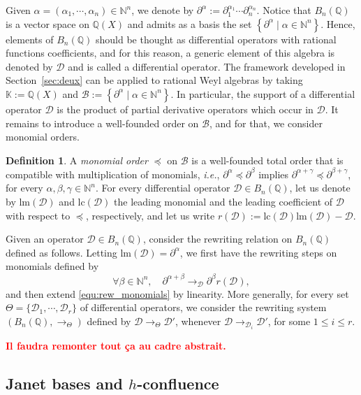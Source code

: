 \documentclass[10pt]{easychair}
\theoremstyle{definition}
\newtheorem{definition}[theorem]{Definition}
\newcommand\secTroisDeux{Janet bases and $h$-confluence}
\newcommand\ie{\emph{i.e.}}
\newcommand\todo[1]{{\bf\textcolor{red}{#1.}}}
\newcommand\diff[1]{\partial_{#1}}
\newcommand\D{\mathcal{D}}
\newcommand\lm{\text{lm}}
\newcommand\lc{\text{lc}}
\newcommand\basis{\mathscr{B}}
\newcommand\K{\mathbb{K}}
\newcommand\Q{\mathbb{Q}}
\newcommand\N{\mathbb{N}}
\newcommand\Weyl{B_n(\Q)}
\newcommand\rewTheta{\to_{\Theta}}
\begin{document}
Given $\alpha=(\alpha_1,\cdots,\alpha_n)\in\N^n$, we denote by 
$\partial^{\alpha}:=\diff{1}^{\alpha_1}\cdots\diff{n}^{\alpha_n}$. Notice
that $\Weyl$ is a vector space on $\Q(X)$ and admits as a basis the set
$\left\{\partial^\alpha\mid\alpha\in\N^n\right\}$. Hence, elements of
$\Weyl$ should be thought as differential operators with rational
functions coefficients, and for this reason, a generic element of this
algebra is denoted by $\D$ and is called a differential operator. The
framework developed in Section~\ref{sec:deux} can be applied to rational
Weyl algebras by taking $\K:=\Q(X)$ and
$\basis:=\left\{\partial^\alpha\mid\alpha\in\N^n\right\}$. In particular,
the support of a differential operator $\D$ is the product of partial
derivative operators which occur in $\D$. It remains to introduce a
well-founded order on $\basis$, and for that, we consider monomial
orders.

\begin{definition}
  A {\em monomial order} $\preceq$ on $\basis$ is a well-founded total
  order that is compatible with multiplication of monomials, \ie,
  $\partial^{\alpha}\preceq\partial^{\beta}$ implies 
  $\partial^{\alpha+\gamma}\preceq\partial^{\beta+\gamma}$, for every
  $\alpha,\beta,\gamma\in\N^n$. For every differential operator
  $\D\in\Weyl$, let us denote by $\lm(\D)$ and $\lc(\D)$ the leading
  monomial and the leading coefficient of $\D$ with respect to $\preceq$,
  respectively, and let us write $r(\D):=\lc(\D)\lm(\D)-\D$. 
\end{definition}

Given an operator $\D\in\Weyl$, consider the rewriting relation on
$\Weyl$ defined as follows. Letting $\lm(\D)=\partial^{\alpha}$, we first
have the rewriting steps on monomials defined by
\begin{equation}\label{equ:rew_monomials}
  \forall\beta\in\N^n,\quad\partial^{\alpha+\beta}
  \to_{\D}\partial^{\beta}r(\D),\end{equation}
and then extend \eqref{equ:rew_monomials} by linearity. More generally,
for every set $\Theta=\{\D_1,\cdots,\D_r\}$ of differential operators, we
consider the rewriting system $(\Weyl,\rewTheta)$ defined by
$\D\rewTheta\D'$, whenever $\D\to_{\D_i}\D'$, for some $1\leq i\leq r$.

\todo{Il faudra remonter tout ça au cadre abstrait}

\subsection{\secTroisDeux}\label{sec:troisDeux}
\end{document}
